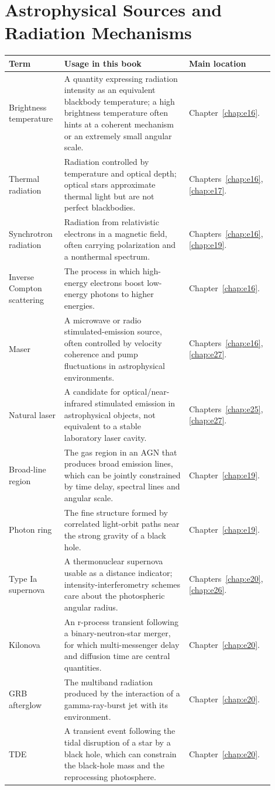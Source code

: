 \section{Astrophysical Sources and Radiation Mechanisms}
\label{appsec:c-sources}

\begin{longtable}{p{0.20\linewidth}p{0.45\linewidth}p{0.25\linewidth}}
\toprule
Term & Usage in this book & Main location \\
\midrule
Brightness temperature & A quantity expressing radiation intensity as an equivalent blackbody temperature; a high brightness temperature often hints at a coherent mechanism or an extremely small angular scale. & Chapter~\ref{chap:e16}. \\
Thermal radiation & Radiation controlled by temperature and optical depth; optical stars approximate thermal light but are not perfect blackbodies. & Chapters~\ref{chap:e16}, \ref{chap:e17}. \\
Synchrotron radiation & Radiation from relativistic electrons in a magnetic field, often carrying polarization and a nonthermal spectrum. & Chapters~\ref{chap:e16}, \ref{chap:e19}. \\
Inverse Compton scattering & The process in which high-energy electrons boost low-energy photons to higher energies. & Chapter~\ref{chap:e16}. \\
Maser & A microwave or radio stimulated-emission source, often controlled by velocity coherence and pump fluctuations in astrophysical environments. & Chapters~\ref{chap:e16}, \ref{chap:e27}. \\
Natural laser & A candidate for optical/near-infrared stimulated emission in astrophysical objects, not equivalent to a stable laboratory laser cavity. & Chapters~\ref{chap:e25}, \ref{chap:e27}. \\
Broad-line region & The gas region in an AGN that produces broad emission lines, which can be jointly constrained by time delay, spectral lines and angular scale. & Chapter~\ref{chap:e19}. \\
Photon ring & The fine structure formed by correlated light-orbit paths near the strong gravity of a black hole. & Chapter~\ref{chap:e19}. \\
Type Ia supernova & A thermonuclear supernova usable as a distance indicator; intensity-interferometry schemes care about the photospheric angular radius. & Chapters~\ref{chap:e20}, \ref{chap:e26}. \\
Kilonova & An r-process transient following a binary-neutron-star merger, for which multi-messenger delay and diffusion time are central quantities. & Chapter~\ref{chap:e20}. \\
GRB afterglow & The multiband radiation produced by the interaction of a gamma-ray-burst jet with its environment. & Chapter~\ref{chap:e20}. \\
TDE & A transient event following the tidal disruption of a star by a black hole, which can constrain the black-hole mass and the reprocessing photosphere. & Chapter~\ref{chap:e20}. \\
\bottomrule
\end{longtable}

